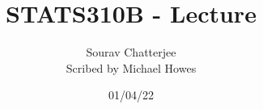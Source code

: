 




\title{STATS310B - Lecture }
\author{Sourav Chatterjee\\ Scribed by Michael Howes}
\date{01/04/22}

\pagestyle{fancy}
\fancyhf{}


\maketitle
\tableofcontents
